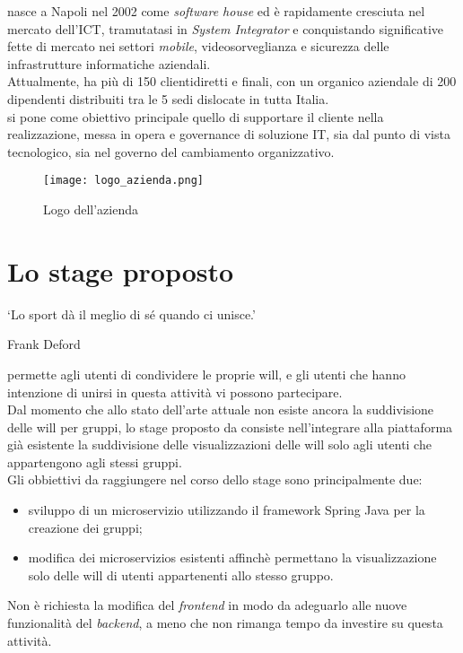 \myCompany\xspace nasce a Napoli nel 2002 come \textit{software house} ed è rapidamente cresciuta nel
mercato dell'\gls{ICT}, tramutatasi in \textit{System Integrator} e conquistando significative fette di mercato nei settori 
\textit{mobile}, videosorveglianza e sicurezza delle infrastrutture informatiche aziendali. \\
Attualmente, \myCompany\xspace ha più di 150 clientidiretti e finali, con un organico aziendale
 di 200 dipendenti distribuiti tra le 5 sedi dislocate in tutta Italia.\\
\myCompany\xspace si pone come obiettivo principale quello di supportare il cliente nella realizzazione,
messa in opera e governance di soluzione IT, sia dal punto di vista tecnologico,
sia nel governo del cambiamento organizzativo.
\begin{figure}[!h] 
    \centering 
    \texttt{[image: logo\_azienda.png]} 
    \caption{Logo dell'azienda}
\end{figure}

\section{Lo stage proposto}
\epigraph{\label{eph: sport}\enquote*{Lo sport dà il meglio di sé quando ci unisce.}}{Frank Deford}
\noindent \productName permette agli utenti di condividere le proprie \gls{will}, 
e gli utenti che hanno intenzione di unirsi in questa attività vi possono partecipare.\\
Dal momento che allo stato dell'arte attuale non esiste ancora la suddivisione delle \gls{will}
per gruppi, lo stage proposto da \myCompany consiste nell'integrare alla piattaforma già esistente
la suddivisione delle visualizzazioni delle \gls{will} solo agli utenti che 
appartengono agli stessi gruppi.\\
Gli obbiettivi da raggiungere nel corso dello stage sono principalmente due:
\begin{itemize}
    \item sviluppo di un \gls{microservizio} utilizzando il \gls{framework} \gls{Spring} Java per la creazione dei gruppi;
    \item modifica dei \glspl{microservizio} esistenti affinchè permettano la visualizzazione solo delle \gls{will} di utenti appartenenti allo stesso gruppo.
\end{itemize}
Non è richiesta la modifica del \textit{frontend} in modo da adeguarlo alle nuove funzionalità del \textit{backend}, a meno che 
non rimanga tempo da investire su questa attività.

